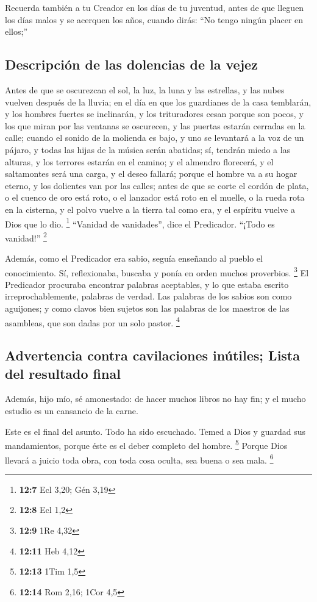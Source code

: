  Recuerda también a tu Creador en los días de tu juventud,
antes de que lleguen los días malos y se acerquen los años, cuando
dirás: ``No tengo ningún placer en ellos;''

\hypertarget{descripciuxf3n-de-las-dolencias-de-la-vejez}{%
\subsection{Descripción de las dolencias de la
vejez}\label{descripciuxf3n-de-las-dolencias-de-la-vejez}}

 Antes de que se oscurezcan el sol, la luz, la luna y las
estrellas, y las nubes vuelven después de la lluvia;  en
el día en que los guardianes de la casa temblarán, y los hombres fuertes
se inclinarán, y los trituradores cesan porque son pocos, y los que
miran por las ventanas se oscurecen,  y las puertas
estarán cerradas en la calle; cuando el sonido de la molienda es bajo, y
uno se levantará a la voz de un pájaro, y todas las hijas de la música
serán abatidas;  sí, tendrán miedo a las alturas, y los
terrores estarán en el camino; y el almendro florecerá, y el saltamontes
será una carga, y el deseo fallará; porque el hombre va a su hogar
eterno, y los dolientes van por las calles;  antes de que
se corte el cordón de plata, o el cuenco de oro está roto, o el lanzador
está roto en el muelle, o la rueda rota en la cisterna,  y
el polvo vuelve a la tierra tal como era, y el espíritu vuelve a Dios
que lo dio. \footnote{\textbf{12:7} Ecl 3,20; Gén 3,19} 
``Vanidad de vanidades'', dice el Predicador. ``¡Todo es vanidad!''
\footnote{\textbf{12:8} Ecl 1,2}

 Además, como el Predicador era sabio, seguía enseñando al
pueblo el conocimiento. Sí, reflexionaba, buscaba y ponía en orden
muchos proverbios. \footnote{\textbf{12:9} 1Re 4,32}  El
Predicador procuraba encontrar palabras aceptables, y lo que estaba
escrito irreprochablemente, palabras de verdad.  Las
palabras de los sabios son como aguijones; y como clavos bien sujetos
son las palabras de los maestros de las asambleas, que son dadas por un
solo pastor. \footnote{\textbf{12:11} Heb 4,12}

\hypertarget{advertencia-contra-cavilaciones-inuxfatiles-lista-del-resultado-final}{%
\subsection{Advertencia contra cavilaciones inútiles; Lista del
resultado
final}\label{advertencia-contra-cavilaciones-inuxfatiles-lista-del-resultado-final}}

 Además, hijo mío, sé amonestado: de hacer muchos libros
no hay fin; y el mucho estudio es un cansancio de la carne.

 Este es el final del asunto. Todo ha sido escuchado.
Temed a Dios y guardad sus mandamientos, porque éste es el deber
completo del hombre. \footnote{\textbf{12:13} 1Tim 1,5} 
Porque Dios llevará a juicio toda obra, con toda cosa oculta, sea buena
o sea mala. \footnote{\textbf{12:14} Rom 2,16; 1Cor 4,5}
